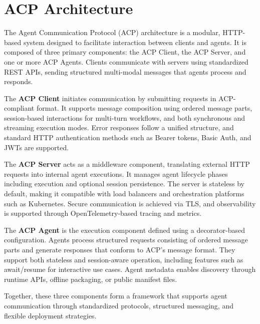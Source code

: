 \documentclass{article}
\begin{document}
\section{ACP Architecture}

The Agent Communication Protocol (ACP) architecture is a modular, HTTP-based system designed to facilitate interaction between clients and agents. It is composed of three primary components: the ACP Client, the ACP Server, and one or more ACP Agents. Clients communicate with servers using standardized REST APIs, sending structured multi-modal messages that agents process and responds.

The \textbf{ACP Client} initiates communication by submitting requests in ACP-compliant format. It supports message composition using ordered message parts, session-based interactions for multi-turn workflows, and both synchronous and streaming execution modes. Error responses follow a unified structure, and standard HTTP authentication methods such as Bearer tokens, Basic Auth, and JWTs are supported.

The \textbf{ACP Server} acts as a middleware component, translating external HTTP requests into internal agent executions. It manages agent lifecycle phases including execution and optional session persistence. The server is stateless by default, making it compatible with load balancers and orchestration platforms such as Kubernetes. Secure communication is achieved via TLS, and observability is supported through OpenTelemetry-based tracing and metrics.

The \textbf{ACP Agent} is the execution component defined using a decorator-based configuration. Agents process structured requests consisting of ordered message parts and generate responses that conform to ACP’s message format. They support both stateless and session-aware operation, including features such as await/resume for interactive use cases. Agent metadata enables discovery through runtime APIs, offline packaging, or public manifest files.

Together, these three components form a framework that supports agent communication through standardized protocols, structured messaging, and flexible deployment strategies.




\end{document}
